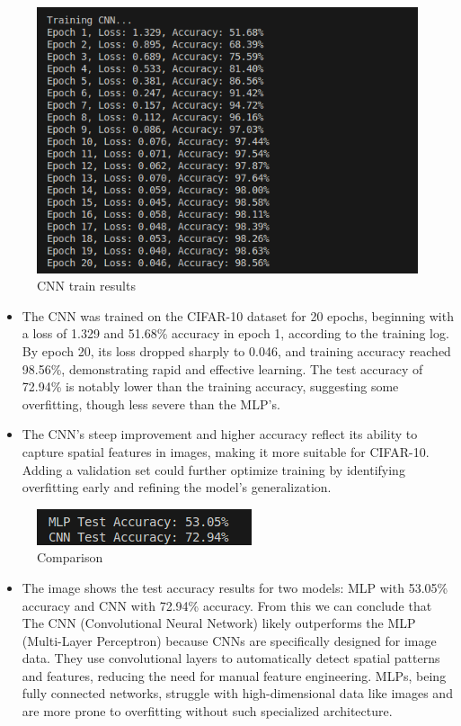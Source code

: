 \documentclass[a4paper,12pt]{article}
\begin{document}
\begin{figure}[h]
    \centering
    \includegraphics[width=0.6\linewidth]{images/CNN_train.png}
    \caption{CNN train results}
    \label{fig:enter-label}
\end{figure}

\begin{itemize}
    \item The CNN was trained on the CIFAR-10 dataset for 20 epochs, beginning with a loss of 1.329 and 51.68\% accuracy in epoch 1, according to the training log. By epoch 20, its loss dropped sharply to 0.046, and training accuracy reached 98.56\%, demonstrating rapid and effective learning. The test accuracy of 72.94\% is notably lower than the training accuracy, suggesting some overfitting, though less severe than the MLP’s.
    
    \item The CNN’s steep improvement and higher accuracy reflect its ability to capture spatial features in images, making it more suitable for CIFAR-10. Adding a validation set could further optimize training by identifying overfitting early and refining the model’s generalization.\
\end{itemize}

\begin{figure}
    \centering
    \includegraphics[width=0.5\linewidth]{images/result.png}
    \caption{Comparison}
    \label{fig:enter-label}
\end{figure}

\begin{itemize}
    \item The image shows the test accuracy results for two models: MLP with 53.05\% accuracy and CNN with 72.94\% accuracy. From this we can conclude that The CNN (Convolutional Neural Network) likely outperforms the MLP (Multi-Layer Perceptron) because CNNs are specifically designed for image data. They use convolutional layers to automatically detect spatial patterns and features, reducing the need for manual feature engineering. MLPs, being fully connected networks, struggle with high-dimensional data like images and are more prone to overfitting without such specialized architecture.
\end{itemize}
\end{document}
